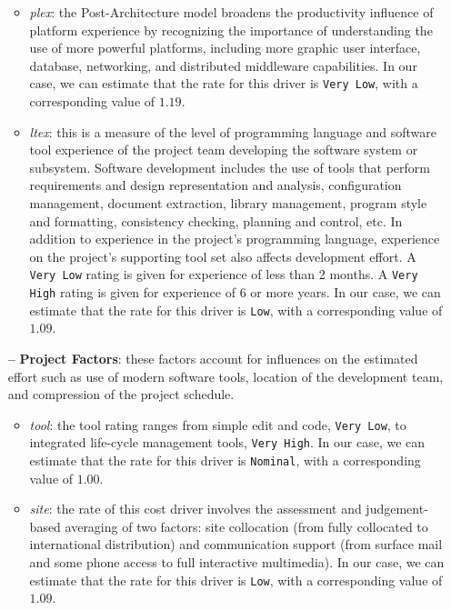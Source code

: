 \begin{itemize}
\begin{itemize}
	\item \textit{\acl{plex}}: the Post-Architecture model broadens the productivity influence of platform experience by recognizing the importance of understanding the use of more powerful platforms, including more graphic user interface, database, networking, and distributed middleware capabilities. In our case, we can estimate that the rate for this driver is \texttt{Very Low}, with a corresponding value of $1.19$.
	
	\item \textit{\acl{ltex}}: this is a measure of the level of programming language and software tool experience of the project team developing the software system or subsystem. Software development includes the use of tools that perform requirements and design representation and analysis, configuration management, document extraction, library management, program style and formatting, consistency checking, planning and control, etc. In addition to experience in the project's programming language, experience on the project's supporting tool set also affects development effort. A \texttt{Very Low} rating is given for experience of less than 2 months. A \texttt{Very High} rating is given for experience of 6 or more years.  In our case, we can estimate that the rate for this driver is \texttt{Low}, with a corresponding value of $1.09$.
		\end{itemize}
		
\item[\textbf{--}] \textbf{Project Factors}: these factors account for influences on the estimated effort such as use of modern software tools, location of the development team, and compression of the project schedule.

	\begin{itemize}
	
	\item \textit{\acl{tool}}: the tool rating ranges from simple edit and code, \texttt{Very Low}, to integrated life-cycle management tools, \texttt{Very High}. In our case, we can estimate that the rate for this driver is \texttt{Nominal}, with a corresponding value of $1.00$.
	
\item \textit{\acl{site}}: the rate of this cost driver involves the assessment and judgement-based averaging of two factors: site collocation (from fully collocated to international distribution) and communication support (from surface mail and some phone access to full interactive multimedia). In our case, we can estimate that the rate for this driver is \texttt{Low}, with a corresponding value of $1.09$.
	

\end{itemize}
\end{itemize}
